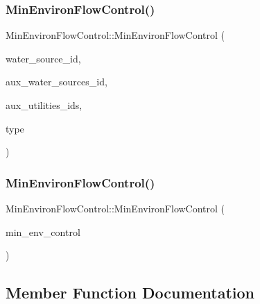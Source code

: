\subsubsection{\texorpdfstring{Min\+Environ\+Flow\+Control()}{MinEnvironFlowControl()}\hspace{0.1cm}{\footnotesize\ttfamily [1/2]}}
{\footnotesize\ttfamily Min\+Environ\+Flow\+Control\+::\+Min\+Environ\+Flow\+Control (\begin{DoxyParamCaption}\item[{int}]{water\+\_\+source\+\_\+id,  }\item[{const vector$<$ int $>$ \&}]{aux\+\_\+water\+\_\+sources\+\_\+id,  }\item[{const vector$<$ int $>$ \&}]{aux\+\_\+utilities\+\_\+ids,  }\item[{int}]{type }\end{DoxyParamCaption})}

\mbox{\label{classMinEnvironFlowControl_a274fc5217a2a79d9c488d903708f5e68_a274fc5217a2a79d9c488d903708f5e68}} 
\subsubsection{\texorpdfstring{Min\+Environ\+Flow\+Control()}{MinEnvironFlowControl()}\hspace{0.1cm}{\footnotesize\ttfamily [2/2]}}
{\footnotesize\ttfamily Min\+Environ\+Flow\+Control\+::\+Min\+Environ\+Flow\+Control (\begin{DoxyParamCaption}\item[{const \mbox{\hyperlink{classMinEnvironFlowControl}{Min\+Environ\+Flow\+Control}} \&}]{min\+\_\+env\+\_\+control }\end{DoxyParamCaption})}



\subsection{Member Function Documentation}
\mbox{\label{classMinEnvironFlowControl_a9dd9d33661f121dda9704288658ecf7e_a9dd9d33661f121dda9704288658ecf7e}} 
